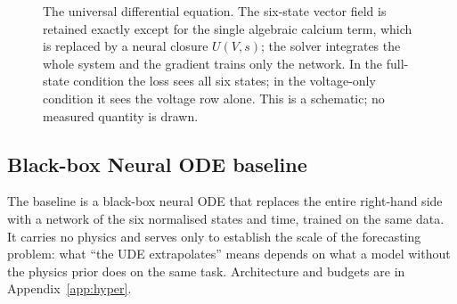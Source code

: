 \documentclass{article}
\newcommand{\Ttrain}{30}       %
\begin{document}
\begin{figure}[t]
  \centering
  \caption{The universal differential equation. The six-state vector field is
  retained exactly except for the single algebraic calcium term, which is
  replaced by a neural closure $U(V,s)$; the solver integrates the whole system
  and the gradient trains only the network. In the full-state condition the loss
  sees all six states; in the voltage-only condition it sees the voltage row
  alone. This is a schematic; no measured quantity is drawn.}
  \label{fig:schematic}
\end{figure}

\subsection{Black-box Neural ODE baseline}

The baseline is a black-box neural ODE \citep{chen2018neural} that replaces the
entire right-hand side with a network of the six normalised states and time,
trained on the same data. It carries no physics and serves only to establish the
scale of the forecasting problem: what ``the UDE extrapolates'' means depends on
what a model without the physics prior does on the same task. Architecture and
budgets are in Appendix~\ref{app:hyper}.
\end{document}

